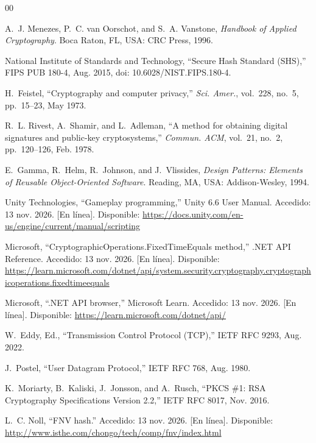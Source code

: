 \documentclass[conference]{IEEEtran}
\begin{document}
\begin{thebibliography}{00}

A.~J. Menezes, P.~C. van Oorschot, and S.~A. Vanstone, \emph{Handbook of Applied Cryptography}. Boca Raton, FL, USA: CRC Press, 1996.

National Institute of Standards and Technology, ``Secure Hash Standard (SHS),'' FIPS PUB 180-4, Aug. 2015, doi: 10.6028/NIST.FIPS.180-4.

H.~Feistel, ``Cryptography and computer privacy,'' \emph{Sci. Amer.}, vol.~228, no.~5, pp.~15--23, May 1973.

R.~L. Rivest, A.~Shamir, and L.~Adleman, ``A method for obtaining digital signatures and public-key cryptosystems,'' \emph{Commun. ACM}, vol.~21, no.~2, pp.~120--126, Feb. 1978.

E.~Gamma, R.~Helm, R.~Johnson, and J.~Vlissides, \emph{Design Patterns: Elements of Reusable Object-Oriented Software}. Reading, MA, USA: Addison-Wesley, 1994.

Unity Technologies, ``Gameplay programming,'' Unity 6.6 User Manual. Accedido: 13 nov. 2026. [En línea]. Disponible: \url{https://docs.unity.com/en-us/engine/current/manual/scripting}

Microsoft, ``CryptographicOperations.FixedTimeEquals method,'' .NET API Reference. Accedido: 13 nov. 2026. [En línea]. Disponible: \url{https://learn.microsoft.com/dotnet/api/system.security.cryptography.cryptographicoperations.fixedtimeequals}

Microsoft, ``.NET API browser,'' Microsoft Learn. Accedido: 13 nov. 2026. [En línea]. Disponible: \url{https://learn.microsoft.com/dotnet/api/}

W.~Eddy, Ed., ``Transmission Control Protocol (TCP),'' IETF RFC 9293, Aug. 2022.

J.~Postel, ``User Datagram Protocol,'' IETF RFC 768, Aug. 1980.

K.~Moriarty, B.~Kaliski, J.~Jonsson, and A.~Rusch, ``PKCS \#1: RSA Cryptography Specifications Version 2.2,'' IETF RFC 8017, Nov. 2016.

L.~C. Noll, ``FNV hash.'' Accedido: 13 nov. 2026. [En línea]. Disponible: \url{http://www.isthe.com/chongo/tech/comp/fnv/index.html}


\end{thebibliography}
\end{document}
